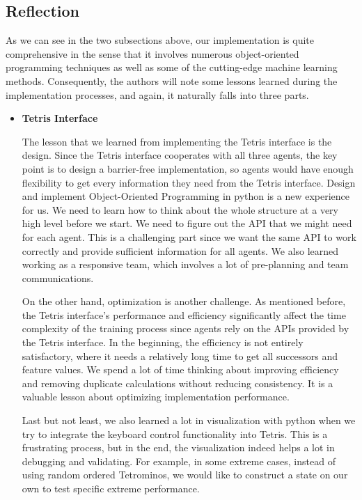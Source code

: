 \documentclass[letterpaper]{article} %
\begin{document}
\subsection{Reflection}

As we can see in the two subsections above, our implementation is quite comprehensive in the sense that it involves numerous object-oriented programming techniques as well as some of the cutting-edge machine learning methods. Consequently, the authors will note some lessons learned during the implementation processes, and again, it naturally falls into three parts.

\begin{itemize}
  
  \item \textbf{Tetris Interface}
  
  The lesson that we learned from implementing the Tetris interface is the design. Since the Tetris interface cooperates with all three agents, the key point is to design a barrier-free implementation, so agents would have enough flexibility to get every information they need from the Tetris interface. Design and implement Object-Oriented Programming in python is a new experience for us. We need to learn how to think about the whole structure at a very high level before we start. We need to figure out the API that we might need for each agent. This is a challenging part since we want the same API to work correctly and provide sufficient information for all agents. We also learned working as a responsive team, which involves a lot of pre-planning and team communications.
 
On the other hand, optimization is another challenge. As mentioned before, the Tetris interface's performance and efficiency significantly affect the time complexity of the training process since agents rely on the APIs provided by the Tetris interface. In the beginning, the efficiency is not entirely satisfactory, where it needs a relatively long time to get all successors and feature values. We spend a lot of time thinking about improving efficiency and removing duplicate calculations without reducing consistency. It is a valuable lesson about optimizing implementation performance.
 
Last but not least, we also learned a lot in visualization with python when we try to integrate the keyboard control functionality into Tetris. This is a frustrating process, but in the end, the visualization indeed helps a lot in debugging and validating. For example, in some extreme cases, instead of using random ordered Tetrominos, we would like to construct a state on our own to test specific extreme performance.
 

\end{itemize}
\end{document}
